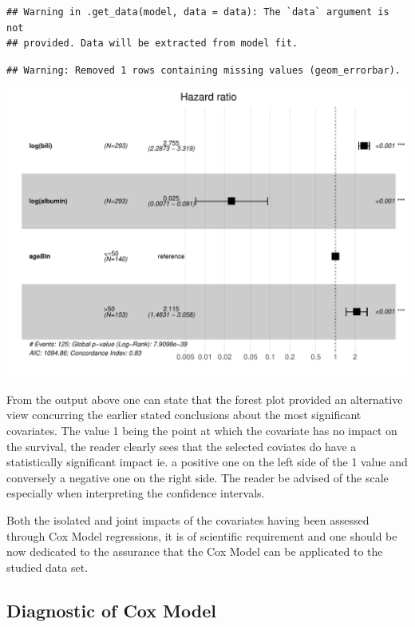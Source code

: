 \documentclass[]{article}
\begin{document}
\begin{verbatim}
## Warning in .get_data(model, data = data): The `data` argument is not
## provided. Data will be extracted from model fit.
\end{verbatim}

\begin{verbatim}
## Warning: Removed 1 rows containing missing values (geom_errorbar).
\end{verbatim}

\includegraphics{survival_v5_files/figure-latex/unnamed-chunk-36-1.pdf}

From the output above one can state that the forest plot provided an
alternative view concurring the earlier stated conclusions about the
most significant covariates. The value 1 being the point at which the
covariate has no impact on the survival, the reader clearly sees that
the selected coviates do have a statistically significant impact ie. a
positive one on the left side of the 1 value and conversely a negative
one on the right side. The reader be advised of the scale especially
when interpreting the confidence intervals.

Both the isolated and joint impacts of the covariates having been
assessed through Cox Model regressions, it is of scientific requirement
and one should be now dedicated to the assurance that the Cox Model can
be applicated to the studied data set.

\subsection{Diagnostic of Cox Model}\label{diagnostic-of-cox-model}
\end{document}
